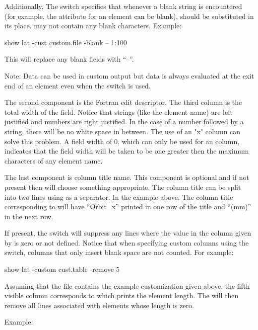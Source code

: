 {{{\begin{description}
Additionally, The  switch specifies
that whenever a blank string is encountered (for example, the
 attribute for an element can be blank),  should
be substituted in its place.  may not contain any blank
characters. Example:
\begin{example}
  show lat -cust custom.file -blank -- 1:100
\end{example}
This will replace any blank fields with ``--''.

Note: Data can be used in custom output but data is always evaluated at
the exit end of an element even when the  switch is used.

The second component is the Fortran edit descriptor. The third column
is the total width of the field. Notice that strings (like the element
name) are left justified and numbers are right justified. In the case
of a number followed by a string, there will be no white space in
between. The use of an "x" column can solve this problem. A field
width of 0, which can only be used for an  column,
indicates that the field width will be taken to be one greater then
the maximum characters of any element name.

The last component is column title name. This component is optional
and if not present then \tao will choose something appropriate. The
column title can be split into two lines using  as a separator.
In the example above, The column title corresponding to  
will have ``Orbit_x'' printed in one row of the title and ``(mm)'' in the next row.

If present, the  switch will
suppress any lines where the value in the column given by  is zero or not defined. Notice that when specifying custom columns using the
 switch, columns that only insert blank space
are not counted. For example:
\begin{example}
  show lat -custom cust.table -remove 5
\end{example}
Assuming that the file  contains the example
customization given above, the fifth visible column corresponds to
 which prints the element length. The 
will then remove all lines associated with elements whose length is
zero.

Example:


\end{description}}}}

